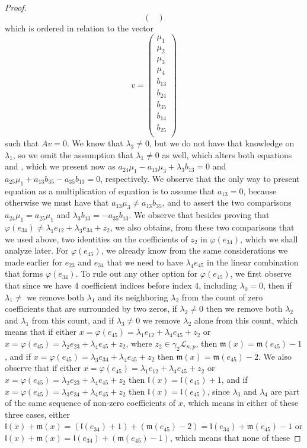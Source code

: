 \documentclass[12pt]{article}
\newcommand*\circled[1]{\tikz[baseline=(char.base)]{
            \small \node[shape=circle,draw,inner sep=1pt] (char) {#1};}}
\begin{document}
\begin{proof}
\[\begin{pmatrix}
\end{pmatrix}\]
which is ordered in relation to the vector \[
v=\begin{pmatrix}
\mu_1\\
\mu_2\\
\mu_3\\
\mu_4\\
b_{13}\\
b_{24}\\
b_{35}\\
b_{14}\\
b_{25}\\
\end{pmatrix}
\]
such that $Av=0$.
We know that $\lambda_3\neq 0$, but we do not have that knowledge on $\lambda_1$, so we omit the assumption that $\lambda_1\neq 0$ as well, which alters both equations \circled{4} and \circled{6}, which we present now as $a_{24}\mu_1-a_{13}\mu_3+\lambda_3 b_{13}=0$ and $a_{25}\mu_1+a_{13}b_{35}-a_{35}b_{13}=0$, respectively. We observe that the only way to present equation \circled{6} as a multiplication of equation \circled{4} is to assume that $a_{13}=0$, because otherwise we must have that $a_{13}\mu_3\neq a_{13}b_{35}$, and to assert the two comparisons $a_{24}\mu_1=a_{25}\mu_1$ and $\lambda_3 b_{13}=-a_{35} b_{13}$. We observe that besides proving that $\varphi(e_{34})\neq\lambda_1 e_{12}+\lambda_3 e_{34}+z_2$, we also obtains, from these two comparisons that we used above, two identities on the coefficients of $z_2$ in $\varphi(e_{34})$, which we shall analyze later. For $\varphi(e_{45})$, we already know from the same considerations we made earlier for $e_{23}$ and $e_{34}$ that we need to have $\lambda_4 e_{45}$ in the linear combination that forms $\varphi(e_{34})$. To rule out any other option for $\varphi(e_{45})$, we first observe that since we have $4$ coefficient indices before index $4$, including $\lambda_0=0$, then if $\lambda_1\neq$ we remove both $\lambda_1$ and its neighboring $\lambda_2$ from the count of zero coefficients that are surrounded by two zeros, if $\lambda_2\neq 0$ then we remove both $\lambda_2$ and $\lambda_1$ from this count, and if $\lambda_3\neq 0$ we remove $\lambda_2$ alone from this count, which means that if either $x=\varphi(e_{45})=\lambda_1 e_{12}+\lambda_4 e_{45}+z_2$ or $x=\varphi(e_{45})=\lambda_2 e_{23}+\lambda_4 e_{45}+z_2$, where $z_2\in\gamma_2\mathcal{L}_{n,p}$, then $\mathfrak{m}(x)=\mathfrak{m}(e_{45})-1$, and if $x=\varphi(e_{45})=\lambda_3 e_{34}+\lambda_4 e_{45}+z_2$ then $\mathfrak{m}(x)=\mathfrak{m}(e_{45})-2$. We also observe that if either $x=\varphi(e_{45})=\lambda_1 e_{12}+\lambda_4 e_{45}+z_2$ or $x=\varphi(e_{45})=\lambda_2 e_{23}+\lambda_4 e_{45}+z_2$ then $\mathfrak{l}(x)=\mathfrak{l}(e_{45})+1$, and if $x=\varphi(e_{45})=\lambda_3 e_{34}+\lambda_4 e_{45}+z_2$ then $\mathfrak{l}(x)=\mathfrak{l}(e_{45})$, since $\lambda_3$ and $\lambda_4$ are part of the same sequence of non-zero coefficients of $x$, which means in either of these three cases, either $\mathfrak{l}(x)+\mathfrak{m}(x)=(\mathfrak{l}(e_{34})+1)+(\mathfrak{m}(e_{45})-2)=\mathfrak{l}(e_{34})+\mathfrak{m}(e_{45})-1$ or $\mathfrak{l}(x)+\mathfrak{m}(x)=\mathfrak{l}(e_{34})+(\mathfrak{m}(e_{45})-1)$, which means that none of these 
\end{proof}
\end{document}

